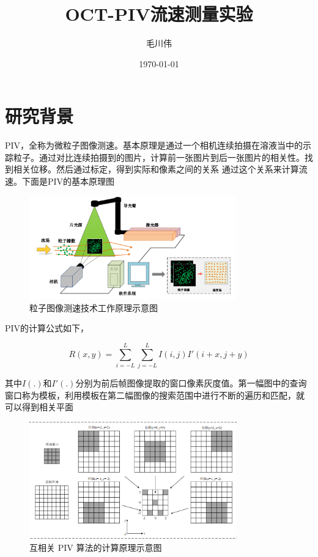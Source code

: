 \documentclass[12pt]{article}
\title{OCT-PIV流速测量实验}
\author{毛川伟}
\date{\today}
\begin{document}
\maketitle

\section{研究背景}

PIV，全称为微粒子图像测速。基本原理是通过一个相机连续拍摄在溶液当中的示踪粒子。通过对比连续拍摄到的图片，计算前一张图片到后一张图片的相关性。找到相关位移。然后通过标定，得到实际和像素之间的关系
通过这个关系来计算流速。下面是PIV的基本原理图

\begin{figure}[h]
    \centering
    \includegraphics[width=0.8\textwidth]{Images/PIV_principles.png}
    \caption{粒子图像测速技术工作原理示意图}
    
\end{figure}

PIV的计算公式如下，


    \begin{equation}
        R(x,y)=\sum_{i=-L}^L\sum_{j=-L}^LI(i,j)I'(i+x,j+y)
    \end{equation}

    其中$I(.)$和$I'(.)$分别为前后帧图像提取的窗口像素灰度值。第一幅图中的查询窗口称为模板，利用模板在第二幅图像的搜索范围中进行不断的遍历和匹配，就
    可以得到相关平面

    \begin{figure}
        \centering
        \includegraphics[width=0.8\textwidth]{Images/互相关算法示意图.png}
        \caption{互相关 PIV 算法的计算原理示意图}
        
        
    \end{figure}
\end{document}
